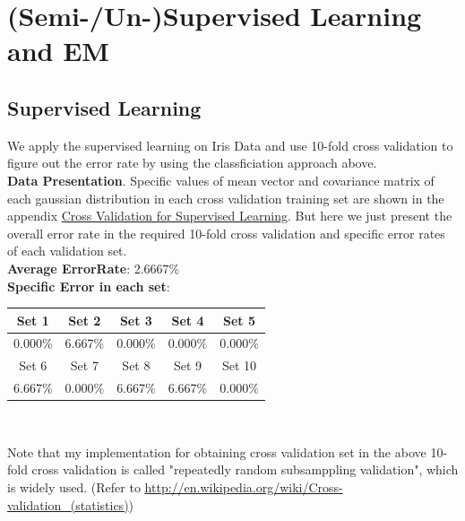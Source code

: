 \documentclass[11pt,a4paper]{article}
\newcommand{\htab}{\hspace*{0.63cm}}
\begin{document}
\section{(Semi-/Un-)Supervised Learning and EM}
\subsection{Supervised Learning}
\htab We apply the supervised learning on Iris Data and use 10-fold cross validation to figure out
the error rate by using the classficiation approach above. \\
\htab \textbf{Data Presentation}. Specific values of mean vector and covariance matrix 
of each gaussian distribution in each cross validation training set are shown in the 
appendix \hyperlink{cv}{Cross Validation for Supervised Learning}. But here we just 
present the overall error rate in the required 10-fold cross validation 
and specific error rates of each validation set. \\
\htab \textbf{Average ErrorRate}: 2.6667\%  \\
\htab \textbf{Specific Error in each set}: 
\begin{center}
    \begin{tabular}{||c|c|c|c|c||} \hline
        Set 1 &  Set 2  & Set 3  & Set 4  &  Set 5  \\ \hline
        0.000\% &  6.667\% &  0.000\% &  0.000\% &  0.000\% \\ \hline
        Set 6  &  Set 7  &  Set 8  &  Set 9  &  Set 10  \\ \hline
        6.667\% &  0.000\% &  6.667\% &  6.667\% &  0.000\% \\ \hline
    \end{tabular} \\
\end{center}
\htab Note that my implementation for obtaining cross validation set in the above 10-fold 
cross validation is called "repeatedly random subsamppling validation", which is widely used.
(Refer to \url{http://en.wikipedia.org/wiki/Cross-validation\_(statistics)})
\end{document}
